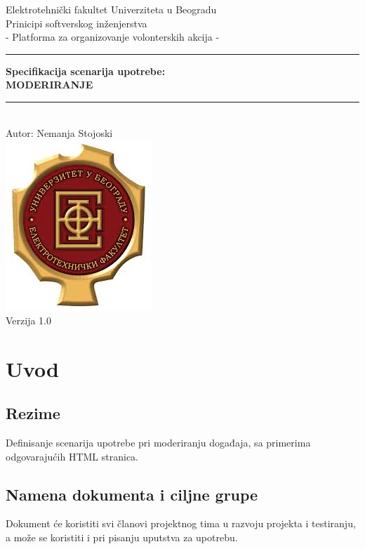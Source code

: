 \documentclass[11pt,a4paper]{article}
\begin{document}
\begin{titlepage}

\centering
\textnormal{\large Elektrotehnički fakultet Univerziteta u Beogradu}\\[0.1cm]
\textnormal{\large Prinicipi softverskog inženjerstva}\\[3cm]

\textnormal{\normalsize - Platforma za organizovanje volonterskih akcija -}\\\vspace{-5mm}
\rule{\textwidth}{0.4pt}
{\huge \bfseries Specifikacija scenarija upotrebe:\\ 
MODERIRANJE\par}\vspace{-1mm}
\rule{\textwidth}{0.4pt}\\\vspace{1mm}
\textnormal{\large Autor: Nemanja Stojoski}\\[6cm]

\includegraphics[scale=0.5]{logo.jpg}\\
\vfill
\textnormal{\normalsize Verzija 1.0}\\

\end{titlepage}

\tableofcontents

\newpage

\section{Uvod}
\subsection{Rezime}
Definisanje scenarija upotrebe pri moderiranju događaja, sa primerima odgovarajućih HTML stranica.
\subsection{Namena dokumenta i ciljne grupe}
Dokument će koristiti svi članovi projektnog tima u razvoju projekta i testiranju, a može se koristiti i pri pisanju uputstva za upotrebu.
\end{document}
